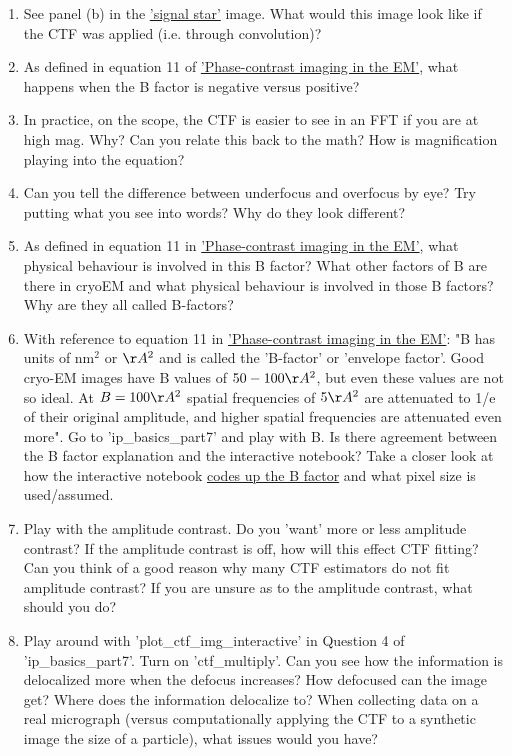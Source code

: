 \documentclass[11pt, oneside]{article}   	%
\begin{document}
\begin{enumerate}
	\item See panel (b) in the \href{https://static5.olympus-lifescience.com/data/olympusmicro/primer/images/mtf/modulationfigure6.jpg?rev=480E}{'signal star'} image. What would this image look like if the CTF was applied (i.e. through convolution)?
	\item As defined in equation 11 of \href{https://cryoemprinciples.yale.edu/sites/default/files/files/2%20Phase%20contrast.pdf}{'Phase-contrast imaging in the EM'}, what happens when the B factor is negative versus positive?
	\item In practice, on the scope, the CTF is easier to see in an FFT if you are at high mag. Why? Can you relate this back to the math? How is magnification playing into the equation?
	\item Can you tell the difference between underfocus and overfocus by eye? Try putting what you see into words? Why do they look different?
	\item As defined in equation 11 in \href{https://cryoemprinciples.yale.edu/sites/default/files/files/2%20Phase%20contrast.pdf}{'Phase-contrast imaging in the EM'}, what physical behaviour is involved in this B factor? What other factors of B are there in cryoEM and what physical behaviour is involved in those B factors? Why are they all called B-factors?
	\item With reference to equation 11 in \href{https://cryoemprinciples.yale.edu/sites/default/files/files/2%20Phase%20contrast.pdf}{'Phase-contrast imaging in the EM'}: "B has units of nm$^2$ or $ \AA^2$ and is called the 'B-factor' or 'envelope factor'. Good cryo-EM images have B values of $50-100 \AA^2$, but even these values are not so ideal. At $B = 100  \AA^ 2$ spatial frequencies of $5 \AA^2$ are attenuated to 1/e of their original amplitude, and higher spatial frequencies are attenuated even more". Go to 'ip\_basics\_part7' and play with B. Is there agreement between the B factor explanation and the interactive notebook? Take a closer look at how the interactive notebook \href{https://gitlab.tudelft.nl/aj-lab/teaching/-/blob/master/binder/hri_practical01/shared/misc.py#L757}{codes up the B factor} and what pixel size is used/assumed.
	\item Play with the amplitude contrast. Do you 'want' more or less amplitude contrast? If the amplitude contrast is off, how will this effect CTF fitting? Can you think of a good reason why many CTF estimators do not fit amplitude contrast? If you are unsure as to the amplitude contrast, what should you do?
	\item Play around with 'plot\_ctf\_img\_interactive' in Question 4 of 'ip\_basics\_part7'. Turn on 'ctf\_multiply'. Can you see how the information is delocalized more when the defocus increases? How defocused can the image get? Where does the information delocalize to? When collecting data on a real micrograph (versus computationally applying the CTF to a synthetic image the size of a particle), what issues would you have?
\end{enumerate}
\end{document}
